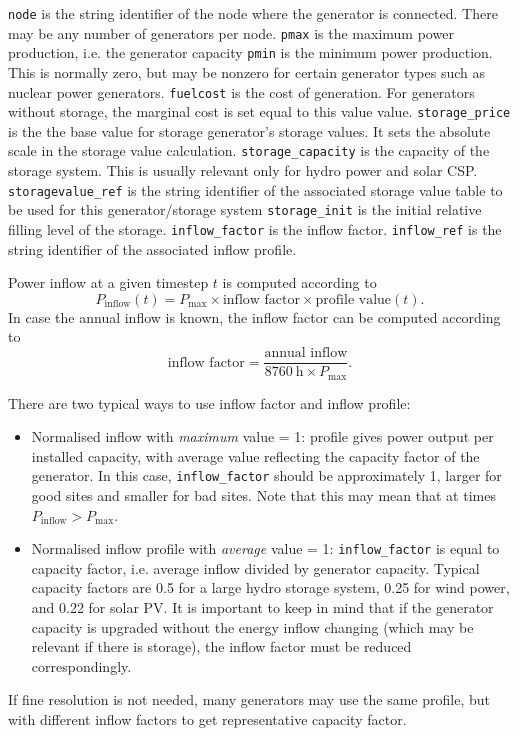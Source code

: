 \documentclass{article}
\begin{document}
\bigskip\noindent
\texttt{node} is the string identifier of the node where the generator is connected. There may be any number of generators per node.
\texttt{pmax} is the maximum power production, i.e. the generator capacity
\texttt{pmin} is the minimum power production. This is normally zero, but may be nonzero for certain generator types such as nuclear power generators.
\texttt{fuelcost} is the cost of generation. For generators without storage, the marginal cost is set equal to this value value.
\texttt{storage\_price} is the the base value for storage generator's storage values. It sets the absolute scale in the storage value calculation.
\texttt{storage\_capacity} is the capacity of the storage system. This is usually relevant only for hydro power and solar CSP.
\texttt{storagevalue\_ref} is the string identifier of the associated storage value table to be used for this generator/storage system
\texttt{storage\_init} is the initial relative filling level of the storage.
\texttt{inflow\_factor} is the inflow factor.
\texttt{inflow\_ref} is the string identifier of the associated inflow profile.

Power inflow at a given timestep $t$ is computed according to
\begin{equation}
	\label{eq:inflow}
	 P_\text{inflow}(t) =  P_\text{max} \times \text{inflow factor} \times \text{profile value}(t) .
\end{equation}
%
In case the annual inflow is known, the inflow factor can be computed according to
\begin{equation}
	\label{eq:inflow_annual}
	 \text{inflow factor} = \frac{\text{annual inflow}}{8760~\text{h} \times P_\text{max}}.
\end{equation}
%

There are two typical ways to use inflow factor and inflow profile:
\begin{itemize}
\item Normalised inflow with \emph{maximum} value = 1: profile gives power output per installed capacity, with average value reflecting the capacity factor of the generator. 
In this case, \texttt{inflow\_factor} should be approximately 1, larger for good sites and smaller for bad sites.  Note that this may mean that at times $ P_\text{inflow}>P_\text{max}$.
\item Normalised inflow profile with \emph{average} value = 1:  \texttt{inflow\_factor} is equal to capacity factor, i.e. average inflow divided by generator capacity. Typical capacity factors are  0.5 for a large hydro storage system, 0.25 for wind power, and 0.22 for solar PV.
It is important to keep in mind that if the generator capacity is upgraded without the energy inflow changing (which may be relevant if there is storage), the inflow factor must be reduced correspondingly. 
\end{itemize}
%
If fine resolution is not needed, many generators may use the same profile, but with different inflow factors to get representative capacity factor.
\end{document}

